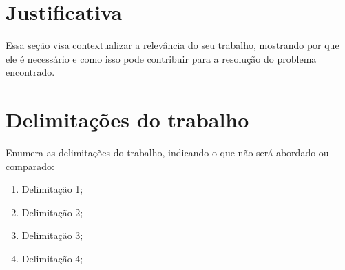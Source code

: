 \section{Justificativa}\label{sec:JUSTIFICATIVA}

Essa seção visa contextualizar a relevância do seu trabalho, mostrando por que ele é necessário e como isso pode contribuir para a resolução do problema encontrado.

\section{Delimitações do trabalho}\label{sec:DELIMITACOES}
Enumera as delimitações do trabalho, indicando o que não será abordado ou comparado:

\begin{enumerate}
    \item Delimitação 1;
    \item Delimitação 2;
    \item Delimitação 3;
    \item Delimitação 4;
\end{enumerate}
